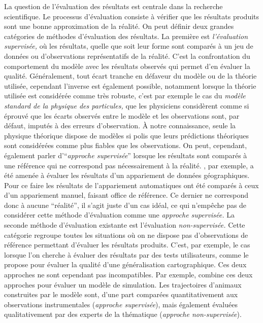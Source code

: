 La question de l’évaluation des résultats est centrale dans la
recherche scientifique. Le processus d'évaluation consiste à vérifier
que les résultats produits sont une bonne approximation de la
réalité. On peut définir deux grandes catégories de méthodes
d'évaluation des résultats. La première est \emph{l'évaluation
  supervisée,} où les résultats, quelle que soit leur forme sont
comparés à un jeu de données ou d'observations représentatifs de la
réalité. C'est la confrontation du comportement du modèle avec les
résultats observés qui permet d'en évaluer la qualité. Généralement,
tout écart tranche en défaveur du modèle ou de la théorie utilisée,
cependant l'inverse est également possible, notamment lorsque la
théorie utilisée est considérée comme très robuste, c'est par exemple
le cas du \emph{modèle standard de la physique des particules,} que
les physiciens considèrent comme si éprouvé que les écarts observés
entre le modèle et les observations sont, par défaut, imputés à des
erreurs d'observation. À notre connaissance, seule la physique
théorique dispose de modèles si polis que leurs prédictions théoriques
sont considérées comme plus fiables que les observations. On peut,
cependant, également parler d'\enquote{\emph{approche supervisée}}
lorsque les résultats sont comparés à une référence qui ne correspond
pas nécessairement à la réalité. \textcite{Olteanu2008}, par exemple,
a été amenée à évaluer les résultats d'un appariement de données
géographiques. Pour ce faire les résultats de l’appariement
automatiques ont été comparés à ceux d'un appariement manuel, faisant
office de référence. Ce dernier ne correspond donc à aucune
\enquote{réalité}, il s'agit juste d'un cas idéal, ce qui n’empêche
pas de considérer cette méthode d’évaluation comme une \emph{approche
  supervisée.} La seconde méthode d'évaluation existante est
l'évaluation \emph{non-supervisée.}  Cette catégorie regroupe toutes
les situations où on ne dispose pas d'observations de référence
permettant d'évaluer les résultats produits. C'est, par exemple, le
cas lorsque l'on cherche à évaluer des résultats par des tests
utilisateurs, comme le propose \textcite{Dumont2018} pour évaluer la
qualité d'une généralisation cartographique. Ces deux approches ne
sont cependant pas incompatibles. Par exemple, \textcite{Jolivet2014}
combine ces deux approches pour évaluer un modèle de simulation. Les
trajectoires d’animaux construites par le modèle sont, d'une part
comparées quantitativement aux observations instrumentales
(\emph{approche supervisée}), mais également évaluées qualitativement
par des experts de la thématique (\emph{approche non-supervisée}).

